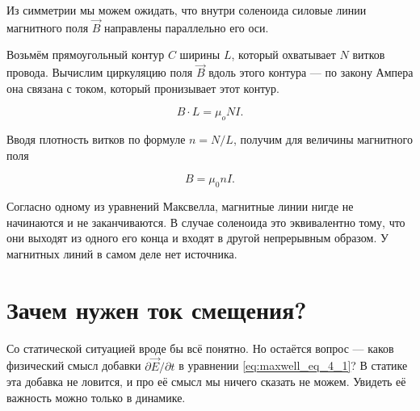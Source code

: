 \documentclass[a4paper,12pt]{article}
\numberwithin{equation}{section}
\newcommand{\pt}{\partial}
\begin{document}
Из симметрии мы можем ожидать, что внутри соленоида силовые линии
магнитного поля $\vec{B}$ направлены параллельно его оси. 

Возьмём прямоугольный контур $C$ ширины $L$, который охватывает $N$
витков провода. Вычислим циркуляцию поля $\vec{B}$ вдоль этого
контура --- по закону Ампера она связана с током, который пронизывает
этот контур. 

\begin{equation}
  \label{eq:der_mfield_solenoid}
  B \cdot L = \mu_o N I.
\end{equation}

Вводя плотность витков по формуле $n = N/L$, получим для величины
магнитного поля

\begin{equation}
  \label{eq:mfield_solenoid}
  B = \mu_0 n I.
\end{equation}

Согласно одному из уравнений Максвелла, магнитные линии нигде не
начинаются и не заканчиваются. В случае соленоида это эквивалентно
тому, что они выходят из одного его конца и входят в другой
непрерывным образом. У магнитных линий в самом деле нет источника. 

\section{Зачем нужен ток смещения?}
\label{sec:displacement_current}

Со статической ситуацией вроде бы всё понятно. Но остаётся вопрос ---
каков физический смысл добавки $\pt \vec{E} / \pt t$ в уравнении
\eqref{eq:maxwell_eq_4_1}? В статике эта добавка не ловится, и про её
смысл мы ничего сказать не можем. Увидеть её важность можно только в
динамике. 

\begin{figure}[h]
  \centering
  \label{fig:displacement}
\end{figure}
\end{document}
